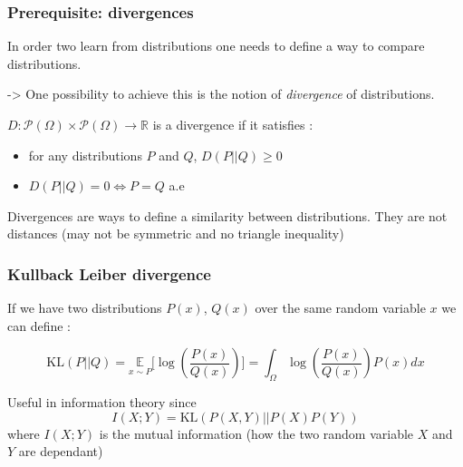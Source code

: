\documentclass[french,9pt]{beamer}
\begin{document}


\begin{frame}
\frametitle{Prerequisite: divergences}

In order two learn from distributions one needs to define a way to compare distributions. 

-> One possibility to achieve this is the notion of \emph{divergence} of distributions.

\pause 

$D: \mathcal{P}(\Omega) \times  \mathcal{P}(\Omega) \rightarrow \mathbb{R}$ is a divergence if it satisfies :

\begin{itemize}
\item for any distributions $P$ and $Q$, $D(P||Q) \geq 0$
\item $D(P||Q) = 0 \iff P=Q $ a.e
\end{itemize}

\pause 
Divergences are ways to define a similarity between distributions. They are not distances (may not be symmetric and no triangle inequality)

\end{frame}

\begin{frame}
\frametitle{Kullback Leiber divergence}

If we have two distributions $P(x)$, $Q(x)$ over the same random variable $x$ we can define :

\begin{equation}
\label{kldiv}
\text{KL}(P||Q)=\underset{x \sim P}{\mathbb{E}}\big[\log(\frac{P(x)}{Q(x)})\big]=\int_{\Omega} \log(\frac{P(x)}{Q(x)}) P(x) dx
\end{equation}

Useful in information theory since  $$I(X;Y)=\text{KL}(P(X,Y)||P(X)P(Y))$$ where $I(X;Y)$ is the mutual information (how the two random variable $X$ and $Y$ are dependant)
  

\end{frame}
\end{document}
